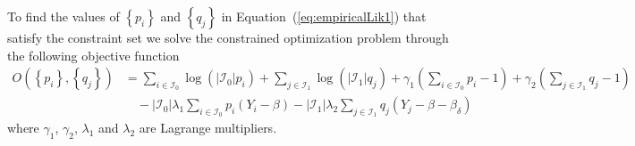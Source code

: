 To find the values of $\left\{p_i\right\}$ and $\left\{q_j\right\}$ in Equation~(\ref{eq:empiricalLik1}) that satisfy the constraint set we solve the constrained optimization problem through the following objective function
\begin{align}
  O(\left\{p_i\right\}, \left\{q_j\right\}) &= \sum_{i \in \mathcal{I}_0}\log(|\mathcal{I}_0| p_i) + \sum_{j \in \mathcal{I}_1}\log(|\mathcal{I}_1| q_j) + \gamma_1\left(\sum_{i \in \mathcal{I}_0} p_i - 1\right) + \gamma_2\left(\sum_{j \in \mathcal{I}_1} q_j - 1\right)\nonumber\\
  &\quad - |\mathcal{I}_0|\lambda_1\sum_{i \in \mathcal{I}_0} p_i(Y_i - \beta) - |\mathcal{I}_1|\lambda_2\sum_{j \in \mathcal{I}_1} q_j(Y_j - \beta - \beta_\delta)
\end{align}
where $\gamma_1$, $\gamma_2$, $\lambda_1$ and $\lambda_2$ are Lagrange multipliers.

